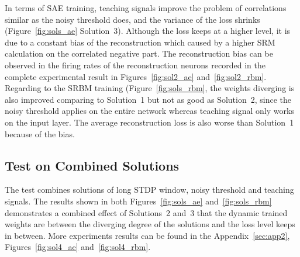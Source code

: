 In terms of SAE training, teaching signals improve the problem of correlations similar as the noisy threshold does, and the variance of the loss shrinks (Figure~\ref{fig:sols_ae} Solution~3).
Although the loss keeps at a higher level, it is due to a constant bias of the reconstruction which caused by a higher SRM calculation on the correlated negative part.
The reconstruction bias can be observed in the firing rates of the reconstruction neurons recorded in the complete experimental result in Figures~\ref{fig:sol2_ae} and~\ref{fig:sol2_rbm}.
Regarding to the SRBM training (Figure~\ref{fig:sols_rbm}, the weights diverging is also improved comparing to Solution~1 but not as good as Solution~2, since the noisy threshold applies on the entire network whereas teaching signal only works on the input layer.
The average reconstruction loss is also worse than Solution~1 because of the bias. 

\subsection{Test on Combined Solutions}
The test combines solutions of long STDP window, noisy threshold and teaching signals.
The results shown in both Figures~\ref{fig:sols_ae} and~\ref{fig:sols_rbm} demonstrates a combined effect of Solutions~2 and~3 that the dynamic trained weights are between the diverging degree of the solutions and the loss level keeps in between.
More experiments results can be found in the Appendix~\ref{sec:app2}, Figures~\ref{fig:sol4_ae} and~\ref{fig:sol4_rbm}.


